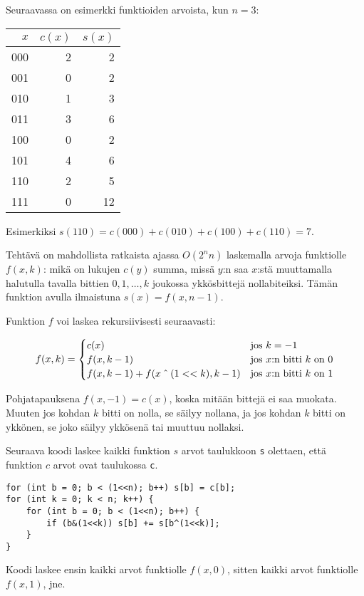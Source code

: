 \noindent
Seuraavassa on esimerkki funktioiden arvoista,
kun $n=3$:

\begin{center}
\begin{tabular}{rrr}
$x$ & $c(x)$ & $s(x)$ \\
\hline
000 & 2 & 2 \\
001 & 0 & 2 \\
010 & 1 & 3 \\
011 & 3 & 6 \\
100 & 0 & 2 \\
101 & 4 & 6 \\
110 & 2 & 5 \\
111 & 0 & 12 \\
\end{tabular}
\end{center}

Esimerkiksi $s(110)=c(000)+c(010)+c(100)+c(110)=7$. 

Tehtävä on mahdollista ratkaista ajassa $O(2^n n)$
laskemalla arvoja funktiolle $f(x,k)$:
mikä on lukujen $c(y)$ summa, missä $y$:n saa $x$:stä
muuttamalla halutulla tavalla bittien $0,1,\ldots,k$
joukossa ykkösbittejä nollabiteiksi.
Tämän funktion avulla ilmaistuna $s(x)=f(x,n-1)$.

Funktion $f$ voi laskea rekursiivisesti seuraavasti:

\begin{equation*}
    f(x,k) = \begin{cases}
               c(x)          & \textrm{jos $k=-1$}\\
               f(x,k-1)          & \textrm{jos $x$:n bitti $k$ on 0}\\
               f(x,k-1)+f(x \XOR (1 < < k),k-1)    & \textrm{jos $x$:n bitti $k$ on 1}\\
           \end{cases}
\end{equation*}

Pohjatapauksena $f(x,-1)=c(x)$,
koska mitään bittejä ei saa muokata.
Muuten jos kohdan $k$ bitti on nolla,
se säilyy nollana, ja jos kohdan $k$ bitti on ykkönen,
se joko säilyy ykkösenä tai muuttuu nollaksi.

Seuraava koodi laskee kaikki funktion $s$ arvot taulukkoon
\texttt{s} olettaen, että funktion $c$ arvot ovat
taulukossa \texttt{c}.
\begin{lstlisting}
for (int b = 0; b < (1<<n); b++) s[b] = c[b];
for (int k = 0; k < n; k++) {
    for (int b = 0; b < (1<<n); b++) {
        if (b&(1<<k)) s[b] += s[b^(1<<k)];
    }
}
\end{lstlisting}
Koodi laskee ensin kaikki arvot funktiolle $f(x,0)$,
sitten kaikki arvot funktiolle $f(x,1)$, jne.
